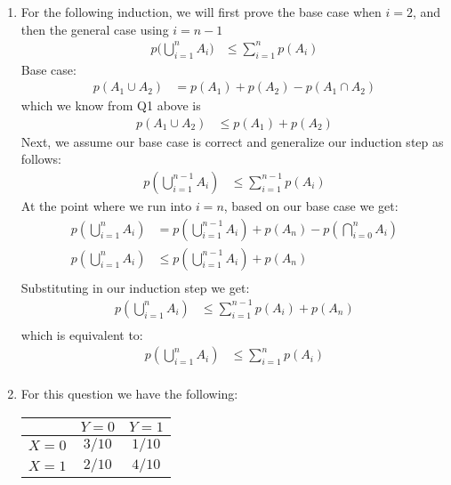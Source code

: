 \documentclass[11pt,a4paper]{article}
\begin{document}
\begin{enumerate}
	
			\item For the following induction, we will first prove the base case when $i=2$, and then the general case using $i=n-1$
			\begin{align*}
				p\Big(\bigcup_{i=1}^{n} A_i \Big) &\leq \sum_{i=1}^{n} p(A_i)
			\end{align*}
			Base case:
			\begin{align*}
				p(A_1 \cup A_2) &= p(A_1) + p(A_2) - p(A_1 \cap A_2)
			\end{align*}
			which we know from Q1 above is
			\begin{align*}
			p(A_1 \cup A_2) &\leq p(A_1) + p(A_2)
			\end{align*}
			Next, we assume our base case is correct and generalize our induction step as follows:
			\begin{align*}
			p(\bigcup_{i=1}^{n-1} A_i) &\leq \sum_{i=1}^{n-1} p(A_i)
			\end{align*}
			At the point where we run into $i=n$, based on our base case we get:
			\begin{align*}
			p(\bigcup_{i=1}^{n} A_i) &= p(\bigcup_{i=1}^{n-1} A_i) + p(A_n) - p(\bigcap_{i=0}^{n} A_i) \\
			p(\bigcup_{i=1}^{n} A_i) &\leq p(\bigcup_{i=1}^{n-1} A_i) + p(A_n)\\
			\end{align*}
			Substituting in our induction step we get:
			\begin{align*}
			p(\bigcup_{i=1}^{n} A_i) &\leq \sum_{i=1}^{n-1} p(A_i) + p(A_n)\\
			\end{align*}
			which is equivalent to:
			\begin{align*}
			p(\bigcup_{i=1}^{n} A_i) &\leq \sum_{i=1}^{n} p(A_i)\\
			\end{align*}
			\item For this question we have the following:
			\begin{table}[h]        
				\centering
				\begin{tabular}{ccc}
				\hline\hline
				& $Y=0$ & $Y=1$ \\ \hline
				$X=0$ & $3/10$ & $1/10$ \\ \hline
				$X=1$  & $2/10$ & $4/10$ \\ \hline\hline
				\end{tabular}
			\end{table}
			

\end{enumerate}
\end{document}
